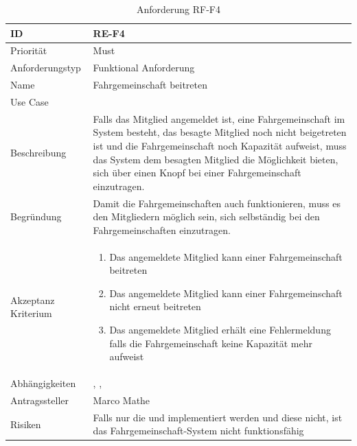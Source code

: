 \begin{table}[ht]
\centering
  \begin{tabular}{ l | p{8cm} }
	\hline
	\rowcolor{gray}
	ID 			&	\textbf{RE-F4}\\ \hline
	Priorität 		&	Must\\ \hline
	Anforderungstyp	&	Funktional Anforderung\\ \hline
	Name 			&	Fahrgemeinschaft beitreten\\ \hline
	Use Case 		&	\nameref{table:use_case_3}\\ \hline
	Beschreibung 	&	Falls das Mitglied angemeldet ist, eine Fahrgemeinschaft im System besteht, das besagte Mitglied noch nicht beigetreten ist und die Fahrgemeinschaft noch Kapazität aufweist, muss das System dem besagten Mitglied die Möglichkeit bieten, sich über einen Knopf bei einer Fahrgemeinschaft einzutragen.\\ \hline
	Begründung 		&	Damit die Fahrgemeinschaften auch funktionieren, muss es den Mitgliedern möglich sein, sich selbständig bei den Fahrgemeinschaften einzutragen.\\ \hline
	Akzeptanz Kriterium	&	\begin{enumerate}
					\item Das angemeldete Mitglied kann einer Fahrgemeinschaft beitreten
					\item Das angemeldete Mitglied kann einer Fahrgemeinschaft nicht erneut beitreten
					\item Das angemeldete Mitglied erhält eine Fehlermeldung falls die Fahrgemeinschaft keine Kapazität mehr aufweist
					\end{enumerate}
					\\ \hline
	Abhängigkeiten 	&	\nameref{table:req_1}, \nameref{table:req_2}, \nameref{table:req_3}\\ \hline
	Antragssteller 	&	Marco Mathe\\ \hline
	Risiken	 	&	Falls nur die \nameref{table:req_2} und \nameref{table:req_3} implementiert werden und diese nicht, ist das Fahrgemeinschaft-System nicht funktionsfähig
  \end{tabular}
   \caption{Anforderung RF-F4}\label{table:req_4}
\end{table}

